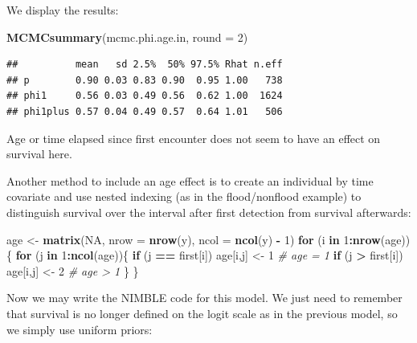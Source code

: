 \documentclass[
  12pt,
]{krantz}
\newenvironment{Shaded}{\begin{snugshade}}{\end{snugshade}}
\newcommand{\AttributeTok}[1]{\textcolor[rgb]{0.13,0.29,0.53}{#1}}
\newcommand{\CommentTok}[1]{\textcolor[rgb]{0.56,0.35,0.01}{\textit{#1}}}
\newcommand{\ConstantTok}[1]{\textcolor[rgb]{0.56,0.35,0.01}{#1}}
\newcommand{\ControlFlowTok}[1]{\textcolor[rgb]{0.13,0.29,0.53}{\textbf{#1}}}
\newcommand{\DecValTok}[1]{\textcolor[rgb]{0.00,0.00,0.81}{#1}}
\newcommand{\FunctionTok}[1]{\textcolor[rgb]{0.13,0.29,0.53}{\textbf{#1}}}
\newcommand{\NormalTok}[1]{#1}
\newcommand{\OtherTok}[1]{\textcolor[rgb]{0.56,0.35,0.01}{#1}}
\newcommand{\SpecialCharTok}[1]{\textcolor[rgb]{0.81,0.36,0.00}{\textbf{#1}}}
\begin{document}
We display the results:

\begin{Shaded}
\begin{Highlighting}[]
\FunctionTok{MCMCsummary}\NormalTok{(mcmc.phi.age.in, }\AttributeTok{round =} \DecValTok{2}\NormalTok{)}
\end{Highlighting}
\end{Shaded}

\begin{verbatim}
##          mean   sd 2.5%  50% 97.5% Rhat n.eff
## p        0.90 0.03 0.83 0.90  0.95 1.00   738
## phi1     0.56 0.03 0.49 0.56  0.62 1.00  1624
## phi1plus 0.57 0.04 0.49 0.57  0.64 1.01   506
\end{verbatim}

Age or time elapsed since first encounter does not seem to have an effect on survival here.

Another method to include an age effect is to create an individual by time covariate and use nested indexing (as in the flood/nonflood example) to distinguish survival over the interval after first detection from survival afterwards:

\begin{Shaded}
\begin{Highlighting}[]
\NormalTok{age }\OtherTok{\textless{}{-}} \FunctionTok{matrix}\NormalTok{(}\ConstantTok{NA}\NormalTok{, }\AttributeTok{nrow =} \FunctionTok{nrow}\NormalTok{(y), }\AttributeTok{ncol =} \FunctionTok{ncol}\NormalTok{(y) }\SpecialCharTok{{-}} \DecValTok{1}\NormalTok{)}
\ControlFlowTok{for}\NormalTok{ (i }\ControlFlowTok{in} \DecValTok{1}\SpecialCharTok{:}\FunctionTok{nrow}\NormalTok{(age))\{}
  \ControlFlowTok{for}\NormalTok{ (j }\ControlFlowTok{in} \DecValTok{1}\SpecialCharTok{:}\FunctionTok{ncol}\NormalTok{(age))\{}
    \ControlFlowTok{if}\NormalTok{ (j }\SpecialCharTok{==}\NormalTok{ first[i]) age[i,j] }\OtherTok{\textless{}{-}} \DecValTok{1} \CommentTok{\# age = 1}
    \ControlFlowTok{if}\NormalTok{ (j }\SpecialCharTok{\textgreater{}}\NormalTok{ first[i]) age[i,j] }\OtherTok{\textless{}{-}} \DecValTok{2}  \CommentTok{\# age \textgreater{} 1}
\NormalTok{  \}}
\NormalTok{\}}
\end{Highlighting}
\end{Shaded}

Now we may write the NIMBLE code for this model. We just need to remember that survival is no longer defined on the logit scale as in the previous model, so we simply use uniform priors:
\end{document}
